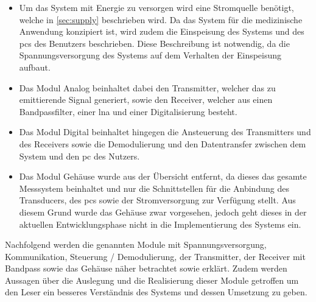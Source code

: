 \begin{itemize}
\item Um das System mit Energie zu versorgen wird eine Stromquelle benötigt, welche in \autoref{sec:supply} beschrieben wird. Da das System für die medizinische Anwendung konzipiert ist, wird zudem die Einspeisung des Systems und des \ac{pc}s des Benutzers beschrieben. Diese Beschreibung ist notwendig, da die Spannungsversorgung des Systems auf dem Verhalten der Einspeisung aufbaut.
\item Das Modul Analog beinhaltet dabei den Transmitter, welcher das zu emittierende Signal generiert, sowie den Receiver, welcher aus einen Bandpassfilter, einer \ac{lna} und einer Digitalisierung besteht.
\item Das Modul Digital beinhaltet hingegen die Ansteuerung des Transmitters und des Receivers sowie die Demodulierung und den Datentransfer zwischen dem System und den \ac{pc} des Nutzers.
\item Das Modul Gehäuse wurde aus der Übersicht entfernt, da dieses das gesamte Messsystem beinhaltet und nur die Schnittstellen für die Anbindung des Transducers, des \ac{pc}s sowie der Stromversorgung zur Verfügung stellt. Aus diesem Grund wurde das Gehäuse zwar vorgesehen, jedoch geht dieses in der aktuellen Entwicklungsphase nicht in die Implementierung des Systems ein.
\end{itemize}
Nachfolgend werden die genannten Module mit Spannungsversorgung, Kommunikation, Steuerung / Demodulierung, der Transmitter, der Receiver mit Bandpass sowie das Gehäuse näher betrachtet sowie erklärt. Zudem werden Aussagen über die Auslegung und die Realisierung dieser Module getroffen um den Leser ein besseres Verständnis des Systems und dessen Umsetzung zu geben.
